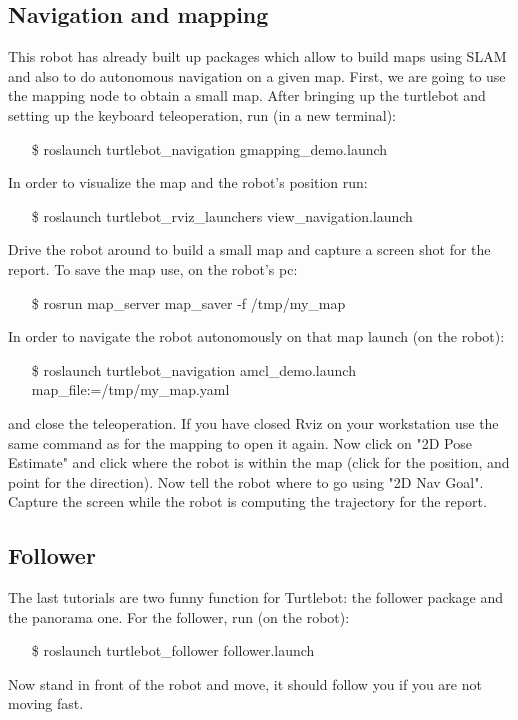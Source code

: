 \documentclass[a4paper,10pt]{article}
\begin{document}
\subsection{Navigation and mapping}
This robot has already built up packages which allow to build maps using SLAM and also to do autonomous navigation on a given map. First, we are going to use the mapping node to obtain a small map. After bringing up the turtlebot and setting up the keyboard teleoperation, run (in a new terminal):
\begin{shaded}
	\begin{itemize}
		\item[\$] roslaunch turtlebot\_navigation gmapping\_demo.launch
	\end{itemize}
\end{shaded}
In order to visualize the map and the robot's position run:
\begin{shaded}
	\begin{itemize}
		\item[\$] roslaunch turtlebot\_rviz\_launchers view\_navigation.launch
	\end{itemize}
\end{shaded}
Drive the robot around to build a small map and capture a screen shot for the report. To save the map use, on the robot's pc:
\begin{shaded}
	\begin{itemize}
		\item[\$] rosrun map\_server map\_saver -f /tmp/my\_map
	\end{itemize}
\end{shaded}

In order to navigate the robot autonomously on that map launch (on the robot):
\begin{shaded}
	\begin{itemize}
		\item[\$] roslaunch turtlebot\_navigation amcl\_demo.launch map\_file:=/tmp/my\_map.yaml
	\end{itemize}
\end{shaded}
and close the teleoperation. If you have closed Rviz on your workstation use the same command as for the mapping to open it again. Now click on "2D Pose Estimate" and click where the robot is within the map (click for the position, and point for the direction). Now tell the robot where to go using "2D Nav Goal". Capture the screen while the robot is computing the trajectory for the report.

\subsection{Follower}
The last tutorials are two funny function for Turtlebot: the follower package and the panorama one. For the follower, run (on the robot):
\begin{shaded}
	\begin{itemize}
		\item[\$] roslaunch turtlebot\_follower follower.launch
	\end{itemize}
\end{shaded}
Now stand in front of the robot and move, it should follow you if you are not moving fast.
\end{document}
